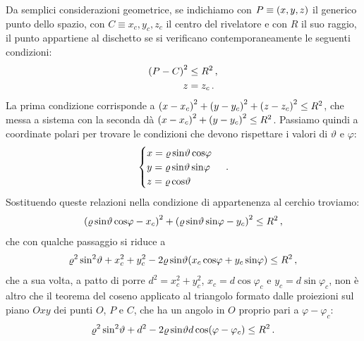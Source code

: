             Da semplici considerazioni geometrice, se indichiamo con $P\equiv\pqty{x,y,z}$ il generico punto dello spazio, con $C\equiv{x_c,y_c,z_c}$ il centro del rivelatore e con $R$ il suo raggio, il punto appartiene al dischetto se si verificano contemporaneamente le seguenti condizioni:
            \begin{align}
                \pqty{P - C}^2 &\leq R^2 \mycomma
                \label{eq:acc:cond-1}
                \\
                z &= z_c \myperiod
                \label{eq:acc:cond-2}
            \end{align}
            La prima condizione corrisponde a $\pqty{x - x_c}^2 + \pqty{y - y_c}^2 + \pqty{z - z_c}^2 \leq R^2$, che messa a sistema con la seconda dà $\pqty{x - x_c}^2 + \pqty{y - y_c}^2 \leq R^2$. Passiamo quindi a coordinate polari per trovare le condizioni che devono rispettare i valori di $\vartheta$ e $\varphi$:
            \begin{equation*}
                \begin{cases}
                    x = \varrho\sin\!\vartheta\cos\!\varphi \\
                    y = \varrho\sin\!\vartheta\sin\!\varphi \\
                    z = \varrho\cos\!\vartheta
                \end{cases}
                \,.
            \end{equation*}
            Sostituendo queste relazioni nella condizione di appartenenza al cerchio troviamo:
            \begin{equation*}
                \pqty{\varrho\sin\!\vartheta\cos\!\varphi - x_c}^2 + \pqty{\varrho\sin\!\vartheta\sin\!\varphi - y_c}^2 \leq R^2
                \mycomma
            \end{equation*}
            che con qualche passaggio si riduce a
            \begin{equation*}
               \varrho^2 \sin\!^2\vartheta + x_c^2 + y_c^2 - 2 \varrho\sin\!\vartheta\pqty{x_c\cos\!\varphi + y_c\sin\!\varphi} \leq R^2
               \mycomma
            \end{equation*}
            che a sua volta, a patto di porre $d^2 = x_c^2 + y_c^2$, $x_c = d\cos\!\varphi_c$ e $y_c = d\sin\!\varphi_c$, non è altro che il teorema del coseno applicato al triangolo formato dalle proiezioni sul piano $Oxy$ dei punti $O$, $P$ e $C$, che ha un angolo in $O$ proprio pari a $\varphi - \varphi_c$:
            \begin{equation}
                \varrho^2 \sin\!^2\vartheta + d^2 - 2 \varrho\sin\!\vartheta d \cos\!\pqty{\varphi - \varphi_c} \leq R^2
                \myperiod
                \label{eq:acc:cond-rho}
            \end{equation}
